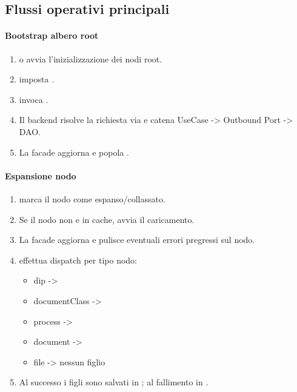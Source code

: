 \subsection{Flussi operativi principali}

\paragraph{Bootstrap albero root}
\begin{enumerate}[labelwidth=0.8cm,leftmargin=1cm]
	\item {} o  avvia l'inizializzazione dei nodi root.
	\item {} imposta .
	\item {} invoca .
	\item Il backend risolve la richiesta via  e catena UseCase -> Outbound Port -> DAO.
	\item La facade aggiorna  e popola .
\end{enumerate}

\paragraph{Espansione nodo}
\begin{enumerate}[labelwidth=0.8cm,leftmargin=1cm]
	\item {} marca il nodo come espanso/collassato.
	\item Se il nodo non e in cache,  avvia il caricamento.
	\item La facade aggiorna  e pulisce eventuali errori pregressi sul nodo.
	\item {} effettua dispatch per tipo nodo:
	\begin{itemize}
		\item dip -> 
		\item documentClass -> 
		\item process -> 
		\item document -> 
		\item file -> nessun figlio
	\end{itemize}
	\item Al successo i figli sono salvati in ; al fallimento in .
\end{enumerate}

